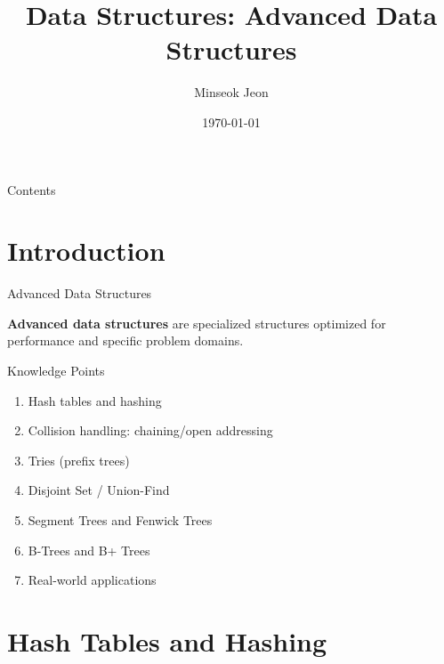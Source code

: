 \documentclass[aspectratio=169,xcolor=dvipsnames]{beamer}
\title[Advanced Data Structures]{Data Structures: Advanced Data Structures}
\author{Minseok Jeon}
\institute{DGIST}
\date{\today}
\begin{document}
\begin{frame}[plain]
  \titlepage
\end{frame}

\begin{frame}[plain]{Contents}
  \tableofcontents
\end{frame}

\section{Introduction}

\begin{frame}{Advanced Data Structures}
  \begin{definition}
    \textbf{Advanced data structures} are specialized structures optimized for performance and specific problem domains.
  \end{definition}

  \vspace{0.5cm}

  \begin{block}{Knowledge Points}
    \begin{enumerate}
      \item Hash tables and hashing
      \item Collision handling: chaining/open addressing
      \item Tries (prefix trees)
      \item Disjoint Set / Union-Find
      \item Segment Trees and Fenwick Trees
      \item B-Trees and B+ Trees
      \item Real-world applications
    \end{enumerate}
  \end{block}
\end{frame}

\section{Hash Tables and Hashing}
\end{document}
